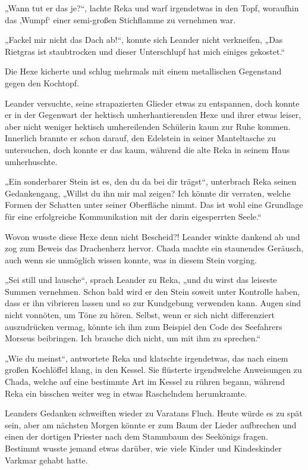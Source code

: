 „Wann tut er das je?“, lachte Reka und warf irgendetwas in den Topf, woraufhin das ‚Wumpf‘ einer semi-großen Stichflamme zu vernehmen war.

„Fackel mir nicht das Dach ab!“, konnte sich Leander nicht verkneifen, „Das Rietgras ist staubtrocken und dieser Unterschlupf hat mich einiges gekostet.“

Die Hexe kicherte und schlug mehrmals mit einem metallischen Gegenstand gegen den Kochtopf.

Leander versuchte, seine strapazierten Glieder etwas zu entspannen, doch konnte er in der Gegenwart der hektisch umherhantierenden Hexe und ihrer etwas leiser, aber nicht weniger hektisch umhereilenden Schülerin kaum zur Ruhe kommen. Innerlich brannte er schon darauf, den Edelstein in seiner Manteltasche zu untersuchen, doch konnte er das kaum, während die alte Reka in seinem Haus umherhuschte.

„Ein sonderbarer Stein ist es, den du da bei dir trägst“, unterbrach Reka seinen Gedankengang, „Willst du ihn mir mal zeigen? Ich könnte dir verraten, welche Formen der Schatten unter seiner Oberfläche nimmt. Das ist wohl eine Grundlage für eine erfolgreiche Kommunikation mit der darin eigesperrten Seele.“

Wovon wusste diese Hexe denn nicht Bescheid?! Leander winkte dankend ab und zog zum Beweis das Drachenherz hervor. Chada machte ein staunendes Geräusch, auch wenn sie unmöglich wissen konnte, was in diesem Stein vorging.

„Sei still und lausche“, sprach Leander zu Reka, „und du wirst das leiseste Summen vernehmen. Schon bald wird er den Stein soweit unter Kontrolle haben, dass er ihn vibrieren lassen und so zur Kundgebung verwenden kann. Augen sind nicht vonnöten, um Töne zu hören. Selbst, wenn er sich nicht differenziert auszudrücken vermag, könnte ich ihm zum Beispiel den Code des Seefahrers Morseus beibringen. Ich brauche dich nicht, um mit ihm zu sprechen.“

„Wie du meinst“, antwortete Reka und klatschte irgendetwas, das nach einem großen Kochlöffel klang, in den Kessel. Sie flüsterte irgendwelche Anweisungen zu Chada, welche auf eine bestimmte Art im Kessel zu rühren begann, während Reka ein bisschen weiter weg in etwas Raschelndem herumkramte.

Leanders Gedanken schweiften wieder zu Varatans Fluch. Heute würde es zu spät sein, aber am nächsten Morgen könnte er zum Baum der Lieder aufbrechen und einen der dortigen Priester nach dem Stammbaum des Seekönigs fragen. Bestimmt wusste jemand etwas darüber, wie viele Kinder und Kindeskinder Varkmar gehabt hatte.

